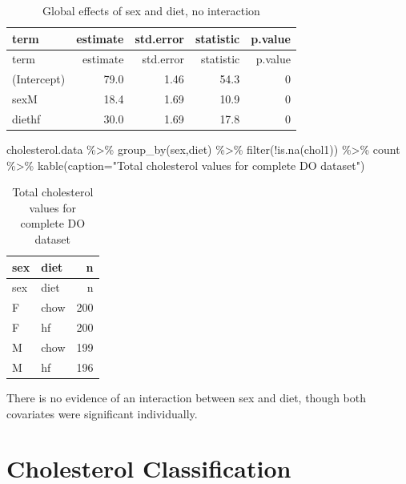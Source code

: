 \documentclass[
]{article}
\newenvironment{Shaded}{\begin{snugshade}}{\end{snugshade}}
\newcommand{\AttributeTok}[1]{\textcolor[rgb]{0.77,0.63,0.00}{#1}}
\newcommand{\FunctionTok}[1]{\textcolor[rgb]{0.00,0.00,0.00}{#1}}
\newcommand{\NormalTok}[1]{#1}
\newcommand{\SpecialCharTok}[1]{\textcolor[rgb]{0.00,0.00,0.00}{#1}}
\newcommand{\StringTok}[1]{\textcolor[rgb]{0.31,0.60,0.02}{#1}}
\begin{document}
\begin{longtable}[]{@{}lrrrr@{}}
\caption{Global effects of sex and diet, no interaction}\tabularnewline
\toprule()
term & estimate & std.error & statistic & p.value \\
\midrule()
\endfirsthead
\toprule()
term & estimate & std.error & statistic & p.value \\
\midrule()
\endhead
(Intercept) & 79.0 & 1.46 & 54.3 & 0 \\
sexM & 18.4 & 1.69 & 10.9 & 0 \\
diethf & 30.0 & 1.69 & 17.8 & 0 \\
\bottomrule()
\end{longtable}

\begin{Shaded}
\begin{Highlighting}[]
\NormalTok{cholesterol.data }\SpecialCharTok{\%\textgreater{}\%}
  \FunctionTok{group\_by}\NormalTok{(sex,diet) }\SpecialCharTok{\%\textgreater{}\%}
  \FunctionTok{filter}\NormalTok{(}\SpecialCharTok{!}\FunctionTok{is.na}\NormalTok{(chol1)) }\SpecialCharTok{\%\textgreater{}\%}
\NormalTok{  count }\SpecialCharTok{\%\textgreater{}\%}
  \FunctionTok{kable}\NormalTok{(}\AttributeTok{caption=}\StringTok{"Total cholesterol values for complete DO dataset"}\NormalTok{)}
\end{Highlighting}
\end{Shaded}

\begin{longtable}[]{@{}llr@{}}
\caption{Total cholesterol values for complete DO
dataset}\tabularnewline
\toprule()
sex & diet & n \\
\midrule()
\endfirsthead
\toprule()
sex & diet & n \\
\midrule()
\endhead
F & chow & 200 \\
F & hf & 200 \\
M & chow & 199 \\
M & hf & 196 \\
\bottomrule()
\end{longtable}

There is no evidence of an interaction between sex and diet, though both
covariates were significant individually.

\hypertarget{cholesterol-classification}{%
\section{Cholesterol Classification}\label{cholesterol-classification}}
\end{document}
